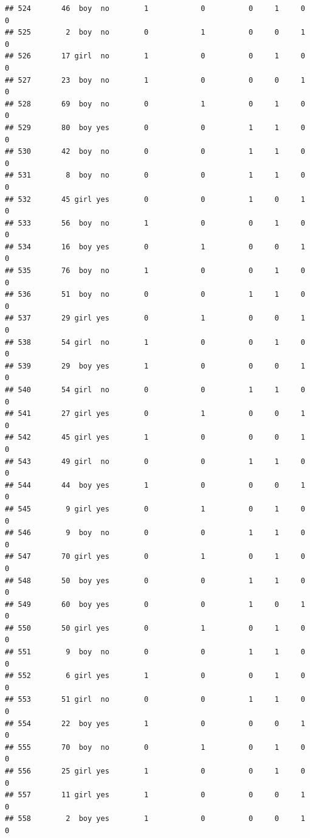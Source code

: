 \documentclass[man]{apa6}
\begin{document}
\begin{verbatim}
## 524       46  boy  no        1            0          0     1     0     0
## 525        2  boy  no        0            1          0     0     1     0
## 526       17 girl  no        1            0          0     1     0     0
## 527       23  boy  no        1            0          0     0     1     0
## 528       69  boy  no        0            1          0     1     0     0
## 529       80  boy yes        0            0          1     1     0     0
## 530       42  boy  no        0            0          1     1     0     0
## 531        8  boy  no        0            0          1     1     0     0
## 532       45 girl yes        0            0          1     0     1     0
## 533       56  boy  no        1            0          0     1     0     0
## 534       16  boy yes        0            1          0     0     1     0
## 535       76  boy  no        1            0          0     1     0     0
## 536       51  boy  no        0            0          1     1     0     0
## 537       29 girl yes        0            1          0     0     1     0
## 538       54 girl  no        1            0          0     1     0     0
## 539       29  boy yes        1            0          0     0     1     0
## 540       54 girl  no        0            0          1     1     0     0
## 541       27 girl yes        0            1          0     0     1     0
## 542       45 girl yes        1            0          0     0     1     0
## 543       49 girl  no        0            0          1     1     0     0
## 544       44  boy yes        1            0          0     0     1     0
## 545        9 girl yes        0            1          0     1     0     0
## 546        9  boy  no        0            0          1     1     0     0
## 547       70 girl yes        0            1          0     1     0     0
## 548       50  boy yes        0            0          1     1     0     0
## 549       60  boy yes        0            0          1     0     1     0
## 550       50 girl yes        0            1          0     1     0     0
## 551        9  boy  no        0            0          1     1     0     0
## 552        6 girl yes        1            0          0     1     0     0
## 553       51 girl  no        0            0          1     1     0     0
## 554       22  boy yes        1            0          0     0     1     0
## 555       70  boy  no        0            1          0     1     0     0
## 556       25 girl yes        1            0          0     1     0     0
## 557       11 girl yes        1            0          0     0     1     0
## 558        2  boy yes        1            0          0     0     1     0

\end{verbatim}
\end{document}
